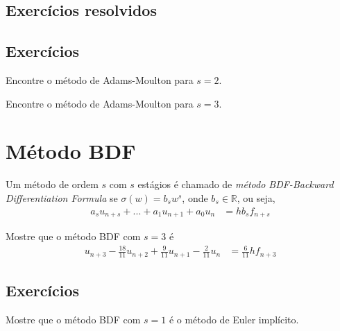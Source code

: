 \subsection*{Exercícios resolvidos}

\emconstrucao

\subsection*{Exercícios}

\begin{exer}
Encontre o método de Adams-Moulton para $s=2$.
\end{exer}

\begin{exer}
Encontre o método de Adams-Moulton para $s=3$.
\end{exer}

\section{Método BDF}
Um método de ordem $s$ com $s$ estágios é chamado de \emph{método BDF-Backward Differentiation Formula} se $\sigma (w)=b_sw^s$, onde $b_s \in \mathbb{R}$, ou seja,
\begin{eqnarray}\label{BDF}
  a_s u_{n+s}+ ...+ a_1 u_{n+1} + a_0u_{n} &=  h b_sf_{n+s}
\end{eqnarray}

\begin{ex}
Mostre que o método BDF com $s=3$ é
\begin{eqnarray}
  u_{n+3} -\frac{18}{11} u_{n+2}+\frac{9}{11}u_{n+1}-\frac{2}{11}u_n &= \frac{6}{11}h f_{n+3}
\end{eqnarray}
\end{ex}

\subsection*{Exercícios}

\begin{exer}
Mostre que o método BDF com $s=1$ é o método de Euler implícito.
\end{exer}

